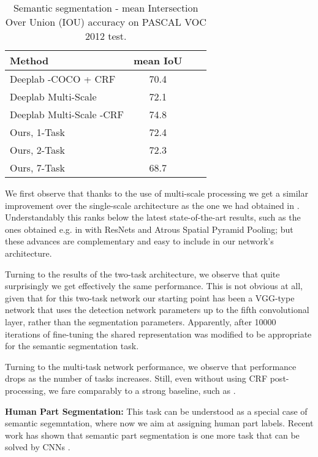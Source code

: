 \documentclass[10pt,twocolumn,letterpaper]{article}
\begin{document}
\begin{table}[!h]
	\begin{tabular}{|l|c|c|c|}
		\hline
	Method	& mean IoU \\\hline\hline
		Deeplab -COCO + CRF \cite{papa15}& 70.4\\\hline
		Deeplab Multi-Scale \cite{iclr16} & 72.1 \\
		Deeplab Multi-Scale -CRF \cite{iclr16} & 74.8 \\\hline
		Ours, 1-Task  & 72.4\\
		Ours, 2-Task  & 72.3\\
		Ours, 7-Task & 68.7 \\\hline
	\end{tabular}
	\caption{Semantic segmentation  - mean Intersection Over Union (IOU) accuracy on PASCAL VOC 2012 test.\label{table:results_e}}
\end{table}
We first observe that thanks to the use of multi-scale processing we get  a similar improvement over the single-scale architecture as the one we had obtained in \cite{iclr16}.
Understandably this ranks below the latest state-of-the-art results, such as the ones obtained e.g. in \cite{ChenPK0Y16} with ResNets and Atrous Spatial Pyramid Pooling; but these advances are complementary and easy to include in our network's architecture. 

Turning to the results of the two-task architecture, we observe that quite surprisingly we get effectively the same performance. This is not obvious at all, given that for this two-task network our starting point has been a VGG-type network that uses the detection network parameters up to the fifth convolutional layer, rather than the segmentation parameters. Apparently, after 10000 iterations of fine-tuning the shared representation was modified to be appropriate for the semantic segmentation task.

Turning to the multi-task network performance, we observe that performance drops as the number of tasks increases. Still, even without using CRF post-processing, we fare comparably to a strong baseline, such as \cite{papa15}. 





 \textbf{Human Part Segmentation:}  This task can be understood as a special case of  semantic segemntation, where now we aim at assigning human part labels. Recent work has shown that semantic part segmentation is one more task that can be solved by CNNs \cite{TsogkasSemanticPart15,HAZN,ChenYWXY15,LiangSFLY16,ChenPK0Y16}.
\end{document}
